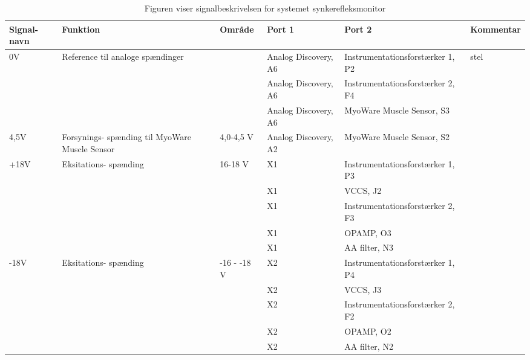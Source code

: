 \begin{table}[H]
\centering
\caption{Figuren viser signalbeskrivelsen for systemet synkerefleksmonitor}
\label{my-label}
\begin{tabular}{|p{1.1cm}|p{2cm}|p{1.4cm}|p{3.5cm}|p{4.4cm}|p{2cm}|}
\hline

\textbf{Signal-navn}  & \textbf{Funktion}                                 & \textbf{Område} & \textbf{Port 1}      & \textbf{Port 2}                  & \textbf{Kommentar} \\ \cline{4-6} \hline


0V & Reference til analoge spændinger  &   & Analog Discovery, A6  & Instrumentationsforstærker 1, P2  &  stel   \\ \cline{4-6}

 &  &   &  Analog Discovery, A6 & Instrumentationsforstærker 2, F4 & \\ \cline{4-6} 
 
 &  &   &  Analog Discovery, A6 & MyoWare Muscle Sensor, S3 & \\ \cline{4-6}

 \hline
4,5V & Forsynings- spænding til MyoWare Muscle Sensor  &  4,0-4,5 V & Analog Discovery, A2 & MyoWare Muscle Sensor, S2&     \\ \cline{4-6}	\hline




+18V & Eksitations- spænding  &  16-18 V & X1& Instrumentationsforstærker 1, P3 &     \\ \cline{4-6}	

&  &   &  X1 & VCCS, J2 & \\ \cline{4-6} 
&  &   &  X1 & Instrumentationsforstærker 2, F3 & \\ \cline{4-6} 
&  &   &  X1 & OPAMP, O3 & \\ \cline{4-6} 
&  &   &  X1 & AA filter, N3 & \\ \cline{4-6} \hline

	
-18V & Eksitations- spænding  &  -16 - -18 V & X2& Instrumentationsforstærker 1, P4 &     \\ \cline{4-6}

&  &   &  X2 & VCCS, J3 & \\ \cline{4-6} 
&  &   &  X2 & Instrumentationsforstærker 2, F2& \\ \cline{4-6} 
&  &   &  X2 & OPAMP, O2 & \\ \cline{4-6} 
&  &   &  X2 & AA filter, N2 & \\ \cline{4-6}  \hline


\end{tabular}
\end{table}
